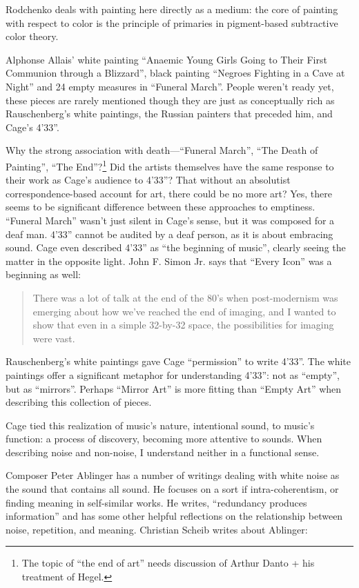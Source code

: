 \documentclass{thesis}
\begin{document}
Rodchenko deals with painting here directly as a medium: the core of painting with respect to color is the principle of primaries in pigment-based subtractive color theory.
	
Alphonse Allais' white painting ``Anaemic Young Girls Going to Their First Communion through a Blizzard'', black painting ``Negroes Fighting in a Cave at Night'' and 24 empty measures in ``Funeral March''. People weren't ready yet, these pieces are rarely mentioned though they are just as conceptually rich as Rauschenberg's white paintings, the Russian painters that preceded him, and Cage's 4'33''.
	
Why the strong association with death---``Funeral March'', ``The Death of Painting'', ``The End''?\footnote{The topic of ``the end of art'' needs discussion of Arthur Danto + his treatment of Hegel.} Did the artists themselves have the same response to their work as Cage's audience to 4'33''? That without an absolutist correspondence-based account for art, there could be no more art? Yes, there seems to be significant difference between these approaches to emptiness. ``Funeral March'' wasn't just silent in Cage's sense, but it was composed for a deaf man. 4'33'' cannot be audited by a deaf person, as it is about embracing sound. Cage even described 4'33'' as ``the beginning of music'', clearly seeing the matter in the opposite light. John F. Simon Jr. says that ``Every Icon'' was a beginning as well:
	
	\begin{quote}
	There was a lot of talk at the end of the 80's when post-modernism was emerging about how we've reached the end of imaging, and I wanted to show that even in a simple 32-by-32 space, the possibilities for imaging were vast.\cite{matthew_mirapaul_in_1997}
	\end{quote}
	
	Rauschenberg's white paintings gave Cage ``permission'' to write 4'33''. The white paintings offer a significant metaphor for understanding 4'33'': not as ``empty'', but as ``mirrors''. Perhaps ``Mirror Art'' is more fitting than ``Empty Art'' when describing this collection of pieces.
	
	Cage tied this realization of music's nature, intentional sound, to music's function: a process of discovery, becoming more attentive to sounds. When describing noise and non-noise, I understand neither in a functional sense.
		
	Composer Peter Ablinger has a number of writings dealing with white noise as the sound that contains all sound. He focuses on a sort if intra-coherentism, or finding meaning in self-similar works. He writes, ``redundancy produces information''\cite{christian_scheib_statics_????} and has some other helpful reflections on the relationship between noise, repetition, and meaning. Christian Scheib writes about Ablinger:
	
\end{document}
